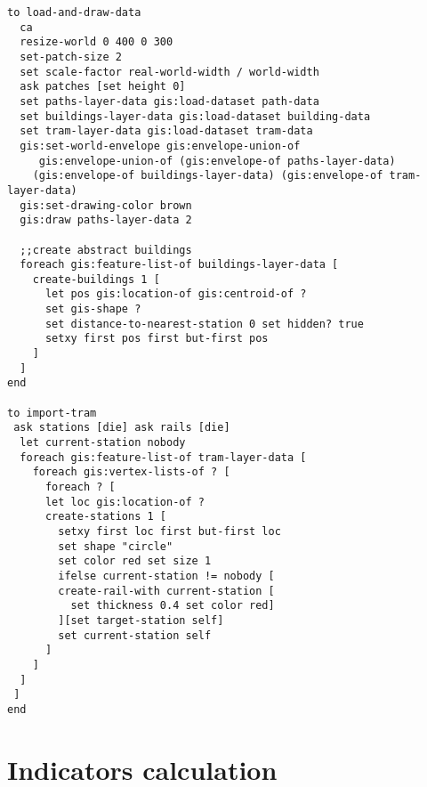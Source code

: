 \documentclass[english]{article}
\begin{document}
\begin{lstlisting}
to load-and-draw-data
  ca
  resize-world 0 400 0 300
  set-patch-size 2
  set scale-factor real-world-width / world-width
  ask patches [set height 0]
  set paths-layer-data gis:load-dataset path-data
  set buildings-layer-data gis:load-dataset building-data
  set tram-layer-data gis:load-dataset tram-data
  gis:set-world-envelope gis:envelope-union-of
     gis:envelope-union-of (gis:envelope-of paths-layer-data)
    (gis:envelope-of buildings-layer-data) (gis:envelope-of tram-layer-data)
  gis:set-drawing-color brown
  gis:draw paths-layer-data 2 

  ;;create abstract buildings
  foreach gis:feature-list-of buildings-layer-data [
    create-buildings 1 [
      let pos gis:location-of gis:centroid-of ?
	  set gis-shape ?
      set distance-to-nearest-station 0 set hidden? true
      setxy first pos first but-first pos
    ]
  ] 
end

to import-tram
 ask stations [die] ask rails [die]
  let current-station nobody
  foreach gis:feature-list-of tram-layer-data [
    foreach gis:vertex-lists-of ? [
      foreach ? [
      let loc gis:location-of ? 
      create-stations 1 [
        setxy first loc first but-first loc
		set shape "circle"
		set color red set size 1
        ifelse current-station != nobody [
		create-rail-with current-station [
		  set thickness 0.4 set color red]
		][set target-station self]
        set current-station self
      ]
    ]
  ] 
 ]
end
\end{lstlisting}



\section*{Indicators calculation}

\begin{lstlisting}
\end{lstlisting}
\end{document}
